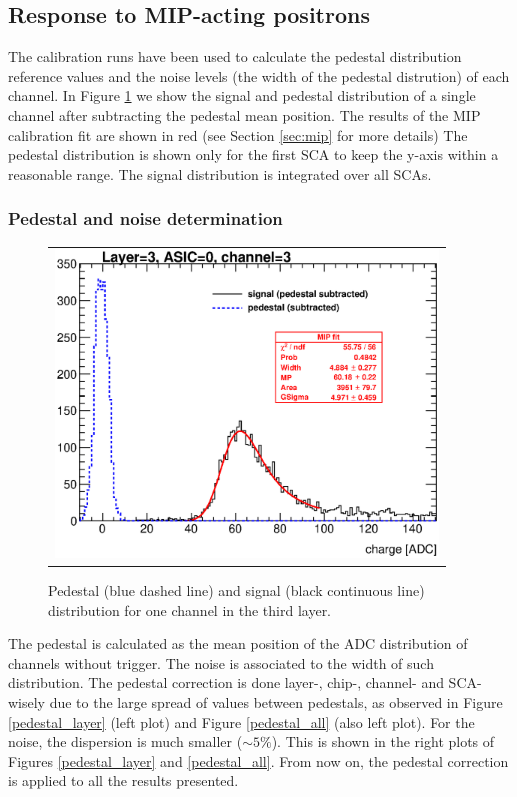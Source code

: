 \documentclass[a4paper,11pt]{article}
\begin{document}
\subsection{Response to MIP-acting positrons}
\label{sec:calib}

The calibration runs have been used to calculate the pedestal distribution reference values 
and the noise levels (the width of the pedestal distrution) of each channel.
In Figure \ref{signal_pedestal} we show the signal and pedestal distribution of a single channel after
subtracting the pedestal mean position. The results of the MIP calibration fit are shown in red (see Section \ref{sec:mip} for more details)
The pedestal distribution is shown only for the first SCA to keep the y-axis within a reasonable range.
The signal distribution is integrated over all SCAs.

\subsubsection{Pedestal and noise determination}
\label{sec:pedestal}


\begin{figure}[!t]
  \centering
  \begin{tabular}{l}
    \includegraphics[width=4in]{../figs/mip_pedestal_example.eps}
  \end{tabular}
  \caption{Pedestal (blue dashed line) and signal (black continuous line) distribution for one channel in the third layer.}
\label{signal_pedestal}
\end{figure}

The pedestal is calculated as the mean position of
the ADC distribution of channels without trigger. The noise is
associated to the width of such distribution.
The pedestal correction is done layer-, chip-, channel- and SCA-wisely due to the large spread of values between pedestals, as observed in 
Figure \ref{pedestal_layer} (left plot) and Figure \ref{pedestal_all} (also left plot).
For the noise, the dispersion is much smaller ($\sim 5 \%$). This is shown in the right plots of Figures \ref{pedestal_layer} and \ref{pedestal_all}.
From now on, the pedestal correction is applied to all the results presented.
\end{document}
